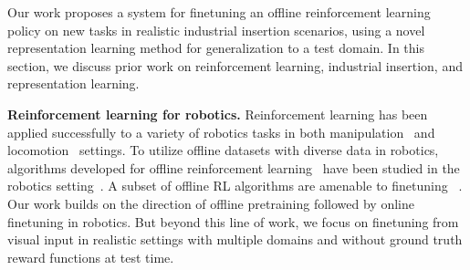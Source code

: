 \documentclass[letterpaper, 10 pt, conference, final]{ieeeconf}   %
\begin{document}

Our work proposes a system for finetuning an offline reinforcement learning policy on new tasks in realistic industrial insertion scenarios, using a novel representation learning method for generalization to a test domain. In this section, we discuss prior work on reinforcement learning, industrial insertion, and representation learning.

\textbf{Reinforcement learning for robotics.}
Reinforcement learning has been applied successfully to a variety of robotics tasks in both manipulation~\cite{peters2008baseball, kober2008mp,deisenroth2011pilco, levine2016gps, levine2017grasping, zhu2019hands} and locomotion~\cite{giusti15trails, nakanishi2004bipedlfd, kalakrishnan09terraintemplates} settings.
To utilize offline datasets with diverse data in robotics, algorithms developed for offline reinforcement learning~\cite{fujimoto19bcq, kumar2020cql, nair2020awac, wu2019brac} have been studied in the robotics setting~\cite{singh2020cog, singh2020parrot, chebotar2021actionable, kalashnikov2021mtopt, kumar2021workflow}.
A subset of offline RL algorithms are amenable to finetuning ~\cite{nair2020awac,villaflor2020finetuning, meng2021starcraft, lee2021finetuning,kostrikov2021iql}.
Our work builds on the direction of offline pretraining followed by online finetuning in robotics.
But beyond this line of work, we focus on finetuning from visual input in realistic settings with multiple domains and without ground truth reward functions at test time.
\end{document}

